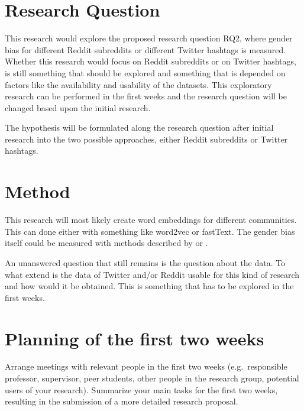 \documentclass[english, a4paper, 11pt]{article}
\begin{document}
\section*{Research Question}
This research would explore the proposed research question RQ2, where gender bias for different Reddit subreddits or different Twitter hashtags is measured. Whether this research
would focus on Reddit subreddits or on Twitter hashtags, is still something that should be
explored and something that is depended on factors like the availability and usability of
the datasets. This exploratory research can be performed in the first weeks and the
research question will be changed based upon the initial research.

The hypothesis will be formulated along the research question after initial research into
the two possible approaches, either Reddit subreddits or Twitter hashtags.

\section*{Method}
This research will most likely create word embeddings for different communities. This can
done either with something like word2vec or fastText. The gender bias itself could be
measured with methods described by \cite{bolukbasi_2016_quantifying_stereotypes} or 
\cite{caliskan_2017_semantics_language_corpora}.

An unanswered question that still remains is the question about the data. To what extend
is the data of Twitter and/or Reddit usable for this kind of research and how would it be
obtained. This is something that has to be explored in the first weeks.


\section*{Planning of the first two weeks}
Arrange meetings with relevant people in the first two weeks (e.g.\ responsible professor, supervisor, peer students, other people in the research group, potential users of your research).
Summarize your main tasks for the first two weeks, resulting in the submission of a more detailed research proposal.

\printbibliography
\end{document}
